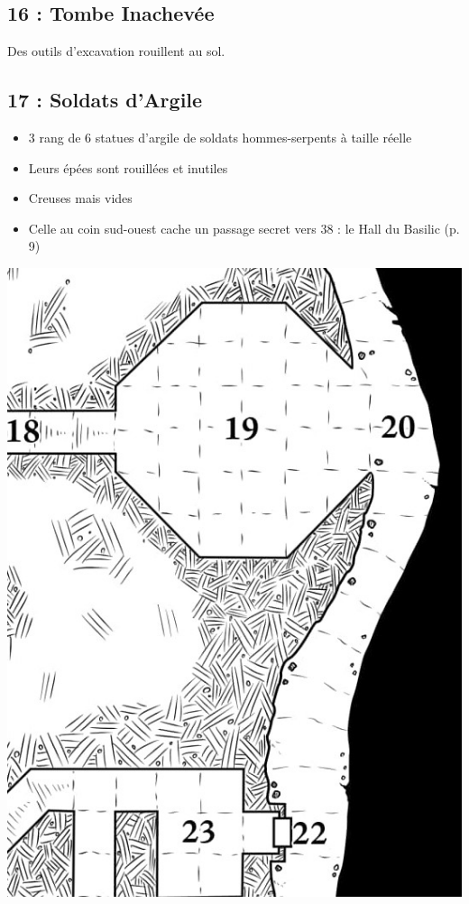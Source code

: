 \subsection{16 : Tombe Inachevée}\label{n2:s16}
Des outils d’excavation rouillent au sol.

\subsection{17 : Soldats d’Argile}\label{n2:s17}
\begin{itemize}
    \item 3 rang de 6 statues d’argile de soldats hommes-serpents à taille réelle
    \item Leurs épées sont rouillées et inutiles
    \item Creuses mais vides
    \item Celle au coin sud-ouest cache un passage secret vers 38 : le Hall du Basilic (p. 9)
\end{itemize}

\newpage
\includegraphics[width=\columnwidth]{pics/map_18-23.jpg}

